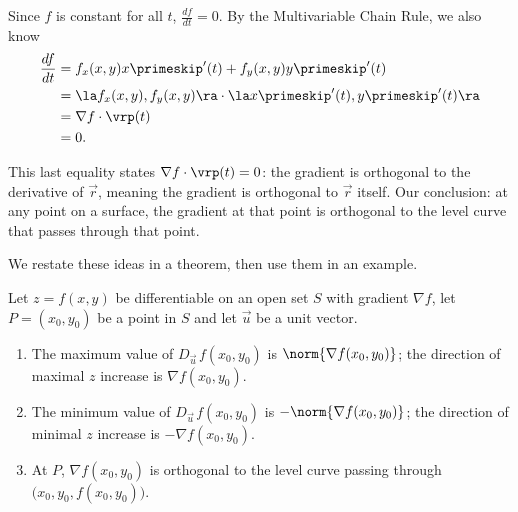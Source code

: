 Since $f$ is constant for all $t$, $\frac{df}{dt} = 0$. By the Multivariable Chain Rule, we also know
\begin{align*}
\frac{df}{dt} &= f_x(x,y)x\primeskip'(t) + f_y(x,y)y\primeskip'(t)\\
	&= \la f_x(x,y),f_y(x,y)\ra \cdot \la x\primeskip'(t),y\primeskip'(t)\ra\\
						&= \nabla f \cdot \vrp(t)\\
						&=0.
\end{align*}

This last equality states $\nabla f \cdot \vrp(t) = 0$: the gradient is orthogonal to the derivative of $\vec r$, meaning the gradient is orthogonal to $\vec r$ itself. Our conclusion: at any point on a surface, the gradient at that point is orthogonal to the level curve that passes through that point.

We restate these ideas in a theorem, then use them in an example.

{Let $z=f(x,y)$ be differentiable on an open set $S$ with gradient $\nabla f$, let $P=(x_0,y_0)$ be a point in $S$ and let $\vec u$ be a unit vector.
\begin{enumerate}
	\item The maximum value of $D_{\vec u\,}f(x_0,y_0)$ is $\norm{\nabla f(x_0,y_0)}$; the direction of maximal $z$ increase is $\nabla f(x_0,y_0)$.
	\item   The minimum value of $D_{\vec u\,}f(x_0,y_0)$ is $-\norm{\nabla f(x_0,y_0)}$; the direction of minimal $z$ increase is $-\nabla f(x_0,y_0)$.
	\item At $P$, $\nabla f(x_0,y_0)$ is orthogonal to the level curve passing through $\big(x_0,y_0,f(x_0,y_0)\big)$.
\end{enumerate}
}

